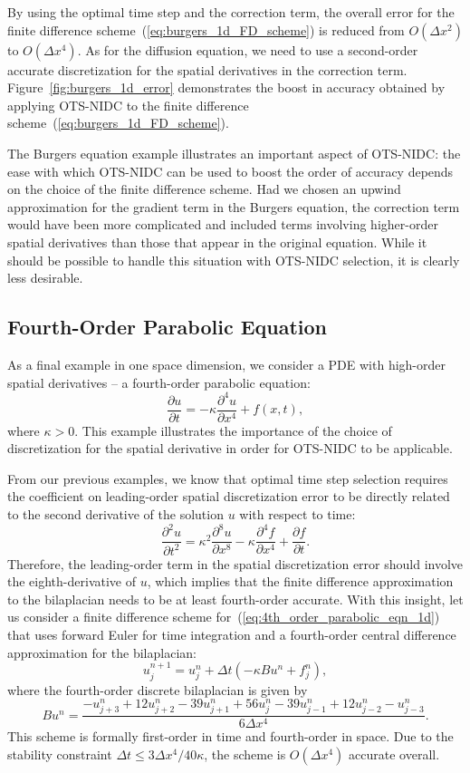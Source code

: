 \documentclass[fleqn,12pt,twoside]{article}
\newcommand{\beq}{\begin{equation}}
\newcommand{\eeq}{\end{equation}}
\def\pt{\partial t}
\def\px{\partial x}
\def\dt{\Delta t}
\def\dx{\Delta x}
\begin{document}
By using the optimal time step and the correction term, the overall error
for the finite difference scheme~(\ref{eq:burgers_1d_FD_scheme}) is reduced
from $O(\dx^2)$ to $O(\dx^4)$.  As for the diffusion equation, we need
to use a second-order accurate discretization for the spatial derivatives
in the correction term.  
Figure~\ref{fig:burgers_1d_error} demonstrates the boost in accuracy obtained 
by applying OTS-NIDC to the finite difference 
scheme~(\ref{eq:burgers_1d_FD_scheme}).

The Burgers equation example illustrates an important aspect of OTS-NIDC:
the ease with which OTS-NIDC can be used to boost the order of accuracy 
depends on the choice of the finite difference scheme.  Had we chosen an 
upwind approximation for the gradient term in the Burgers equation, the 
correction term would have been more complicated and included terms involving 
higher-order spatial derivatives than those that appear in the original 
equation.  While it should be possible to handle this situation with OTS-NIDC 
selection, it is clearly less desirable.


\subsection{Fourth-Order Parabolic Equation}
As a final example in one space dimension, we consider a PDE with high-order
spatial derivatives -- a fourth-order parabolic equation: 
\beq
  \frac{\partial u}{\pt} = -\kappa \frac{\partial^4 u}{\px^4} + f(x,t), 
  \label{eq:4th_order_parabolic_eqn_1d}
\eeq
where $\kappa > 0$.  This example illustrates the importance of the choice of
discretization for the spatial derivative in order for OTS-NIDC to be
applicable. 

From our previous examples, we know that optimal time step selection requires 
the coefficient on leading-order spatial discretization error to be directly 
related to the second derivative of the solution $u$ with respect to time:
\beq
  \frac{\partial^2 u}{\pt^2} = 
    \kappa^2 \frac{\partial^8 u}{\px^8} 
  - \kappa \frac{\partial^4 f}{\px^4} 
  + \frac{\partial f}{\pt}
  \label{eq:4th_order_parabolic_eqn_1d_second_time_derivative}.
\eeq
Therefore, the leading-order term in the spatial discretization 
error should involve the eighth-derivative of $u$, which implies that the
finite difference approximation to the bilaplacian needs to be at least 
fourth-order accurate.  With this insight, let us consider a finite 
difference scheme for~(\ref{eq:4th_order_parabolic_eqn_1d}) that 
uses forward Euler for time integration and a fourth-order central 
difference approximation for the bilaplacian:
\beq
  u^{n+1}_j = u^{n}_j + \dt \left( -\kappa B u^n + f_j^n \right), 
  \label{eq:4th_order_parabolic_eqn_1d_FD_scheme}
\eeq
where the fourth-order discrete bilaplacian is given by
\beq
  B u^n = \frac{ -u^{n}_{j+3} + 12 u^{n}_{j+2} - 39 u^{n}_{j+1}
               + 56 u^{n}_j
               - 39 u^{n}_{j-1} + 12 u^{n}_{j-2} -u^{n}_{j-3} }
               {6 \dx^4}.
\eeq
This scheme is formally first-order in time and fourth-order in space.  
Due to the stability constraint $\dt \le 3\dx^4/40 \kappa$, the scheme is 
$O(\dx^4)$ accurate overall.
\end{document}
